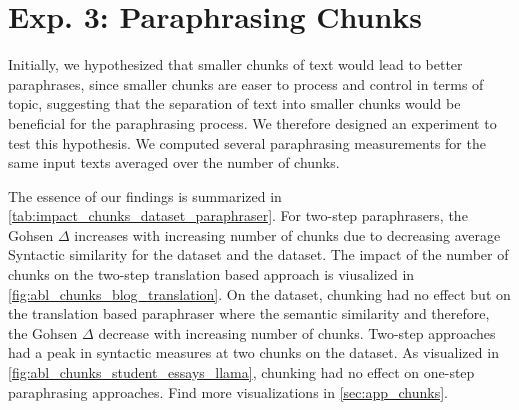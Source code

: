 \section{Exp. 3: Paraphrasing Chunks}

Initially, we hypothesized that smaller chunks of text would lead to better paraphrases, since smaller chunks are easer to process and control in terms of topic, suggesting that the separation of text into smaller chunks would be beneficial for the paraphrasing process.
We therefore designed an experiment to test this hypothesis.
We computed several paraphrasing measurements for the same input texts averaged over the number of chunks.

\begin{table}[]
\centering
\caption{Effect of increasing the number of chunks on different paraphrasers on different datasets. The asterisk * indicates that \texttt{qwen3-32b}'s syntactic measures have a peak at three chunks.}
\label{tab:impact_chunks_dataset_paraphraser}
\end{table}

The essence of our findings is summarized in \autoref{tab:impact_chunks_dataset_paraphraser}.
For two-step paraphrasers, the Gohsen $\Delta$ increases with increasing number of chunks due to decreasing average Syntactic similarity for the \dataBlog{} dataset and the \dataStudent{} dataset.
The impact of the number of chunks on the two-step translation based approach is viusalized in \autoref{fig:abl_chunks_blog_translation}.
On the \dataGutenberg{} dataset, chunking had no effect but on the translation based paraphraser where the semantic similarity and therefore, the Gohsen $\Delta$ decrease with increasing number of chunks.
Two-step approaches had a peak in syntactic measures at two chunks on the \dataPan{} dataset.
As visualized in \autoref{fig:abl_chunks_student_essays_llama}, chunking had no effect on one-step paraphrasing approaches.
Find more visualizations in \autoref{sec:app_chunks}.

